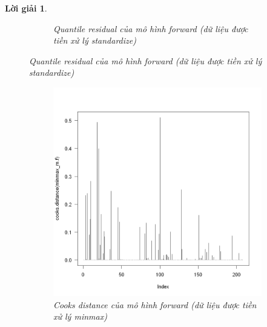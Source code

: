 \documentclass[14pt, a4paper]{article}
\theoremstyle{sltheorem}
\theoremstyle{soltheorem}
\newtheorem*{loigiai}{Lời giải}
\begin{document}
\begin{loigiai}
\begin{figure}[h!]
\begin{subfigure}[b]{0.4\textwidth}
            \caption{Quantile residual của mô hình forward (dữ liệu được tiền xử lý standardize)}
        \end{subfigure}
        \label{fig:Quantile-resid-mf}
    \end{figure}

    \begin{figure}[h!]
        \centering
        \begin{subfigure}[b]{0.4\textwidth}
            \centering
            \includegraphics[width=\textwidth]{figures/minmax_mf_cooks.png}
            \caption{Cooks distance của mô hình forward (dữ liệu được tiền xử lý minmax)}
        \end{subfigure}
        \hfill
        \begin{subfigure}[b]{0.4\textwidth}
            \centering

\end{subfigure}
\end{figure}
\end{loigiai}
\end{document}
